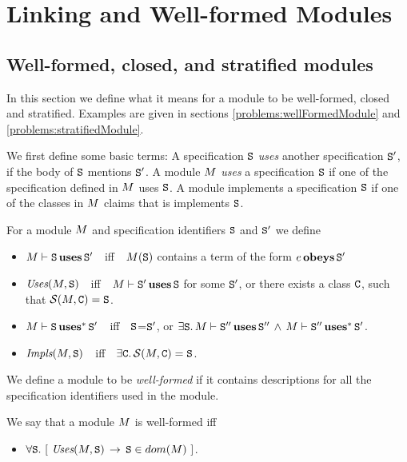 \section{Linking and Well-formed Modules}
\label{sect:Linking}

\subsection{Well-formed, closed, and stratified modules}

In this section we define what it means for a module to be well-formed, closed and  stratified. Examples are given in sections \ref{problems:wellFormedModule} and \ref{problems:stratifiedModule}.

We first define some basic terms: A specification $\SPC$ {\em uses} another specification $\SPC'$, if the body of $\SPC$ mentions $\SPC'$.
A module $\M$ {\em uses} a  specification $\SPC$ if one of the specification defined in $\M$ uses   $\SPC$. A module implements a
specification $\SPC$ if one of the classes in $\M$ claims that is implements $\SPC$.

\begin{definition}
\label{def:uses}
\label{def:impls}
For a module $\M$ and specification identifiers $\SPC$ and $\SPC'$ we define
\begin{itemize}
   \item
   $\M \vdash \SPC \uses \SPC'$\ \ iff\ \  $\M(\SPC)$ contains a term of the form $e \obeys \SPC'$
   \item
   $\Muses {\M} {\SPC}$\ \ iff\ \  $\M \vdash \SPC' \uses \SPC$ for some $\SPC'$, or there exists a class $\CP$, such that ${\cal S}(\M,\CP)=\SPC$.
   \item
   $\M \vdash \SPC \usestr \SPC'$\ \ iff\ \  $\SPC$=$\SPC'$, or $\exists \SPC.\,\M \vdash \SPC'' \uses \SPC''\, \wedge \, \M \vdash \SPC'' \usestr \SPC'$.
   \item
   $\Mimpls {\M} {\SPC}$\ \ iff\ \   $\exists \CP.\,{\cal S}(\M,\CP)=\SPC$.
 \end{itemize}

\end{definition}

 We  define a  module to be {\em well-formed} if it contains descriptions for all the specification identifiers used in the module.

\begin{definition}
\label{def:well:formed:module}
We say that a module $\M$   is well-formed iff
\begin{itemize}
   \item
   $\forall \SPC.\ [\ \Muses {\M} {\SPC} \, \rightarrow\, {\SPC}\in dom(\M)\ ]$.
\end{itemize}
\end{definition}

